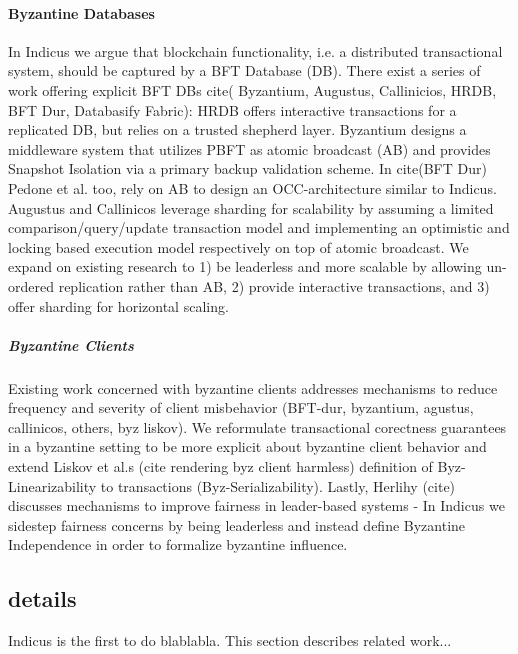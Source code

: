 \paragraph{Byzantine Databases}
In Indicus we argue that blockchain functionality, i.e. a distributed transactional system, should be captured by a BFT Database (DB). There exist a series of work offering explicit BFT DBs  
cite( Byzantium, Augustus, Callinicios, HRDB, BFT Dur, Databasify Fabric): HRDB offers interactive transactions for a replicated DB, but relies on a trusted shepherd layer. Byzantium designs a middleware system that utilizes PBFT as atomic broadcast (AB) and provides Snapshot Isolation via a primary backup validation scheme. In cite(BFT Dur) Pedone et al. too, rely on AB to design an OCC-architecture similar to Indicus. Augustus and Callinicos leverage sharding for scalability by assuming a limited comparison/query/update transaction model and implementing an optimistic and locking based execution model respectively on top of atomic broadcast.
We expand on existing research to 1) be leaderless and more scalable by allowing un-ordered replication rather than AB, 2) provide interactive transactions, and 3) offer sharding for horizontal scaling.
\subparagraph{Byzantine Clients}
Existing work concerned with byzantine clients addresses mechanisms to reduce frequency and severity of client misbehavior (BFT-dur, byzantium, agustus, callinicos, others, byz liskov). We reformulate transactional corectness guarantees in a byzantine setting to be more explicit about byzantine client behavior  and extend Liskov et al.s (cite rendering byz client harmless) definition of Byz-Linearizability to transactions (Byz-Serializability). 
Lastly, Herlihy (cite) discusses mechanisms to improve fairness in leader-based systems - In Indicus we sidestep fairness concerns by being leaderless and instead define Byzantine Independence in order to formalize byzantine influence.











\subsection{details}


Indicus is the first to do blablabla. This section describes related work...


